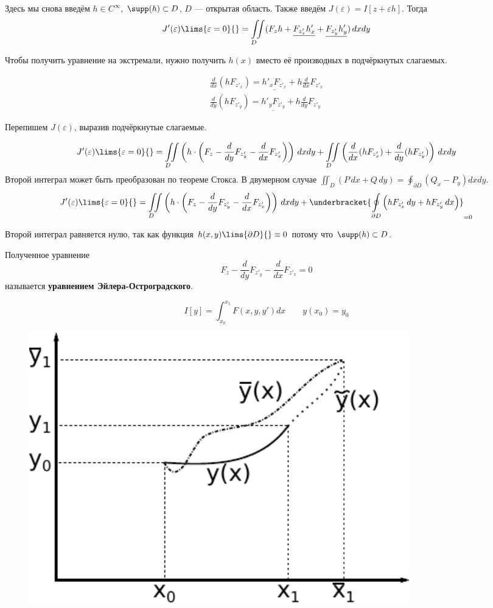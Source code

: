 	Здесь мы снова введём $h \in C^{\infty}$, $\supp(h) \subset D$, $D$ --- открытая область. Также введём
	$J(\varepsilon) = I[z + \varepsilon h]$. Тогда 
	$$J'(\varepsilon)\lims{\varepsilon = 0}{} = 
	  \underset{D\hspace{10pt}}{\iint} (F_zh + \underline{F_{z'_x}h'_x} + \underline{F_{z'_y}h'_y}) \,dxdy$$
	  
	Чтобы получить уравнение на экстремали, нужно получить $h(x)$ вместо её производных в подчёркнутых слагаемых.
	
	\begin{align*}
		\frac{d}{dx}(h F_{z'_x}) = \underline{h'_xF_{z'_x}} + h\frac{d}{dx}F_{z'_x} \\
		\frac{d}{dy}(h F_{z'_y}) = \underline{h'_yF_{z'_y}} + h\frac{d}{dy}F_{z'_y}
	\end{align*}
	
	Перепишем $J(\varepsilon)$, выразив подчёркнутые слагаемые.
	
	$$
		J'(\varepsilon)\lims{\varepsilon = 0}{} = 
		\underset{D\hspace{10pt}}{\iint} \left( h\cdot\left(F_z - \frac{d}{dy}F_{z'_y} - \frac{d}{dx}F_{z'_x}\right) \right) \,dxdy
		+ \underset{D\hspace{10pt}}{\iint} \left(\frac{d}{dx}(hF_{z'_x}) + \frac{d}{dy}(hF_{z'_y}) \right) \,dxdy
	$$
	Второй интеграл может быть преобразован по теореме Стокса. В двумерном случае 
	$\iint_{D} (P\,dx + Q\,dy) = \oint_{\partial D} (Q_x - P_y) dx dy$.
	$$
		J'(\varepsilon)\lims{\varepsilon = 0}{} = 
		\underset{D\hspace{10pt}}{\iint} \left( h\cdot\left(F_z - \frac{d}{dy}F_{z'_y} - \frac{d}{dx}F_{z'_x}\right) \right) \,dxdy
		+ \underbracket{\underset{\partial D}{\oint} \left(hF_{z'_x}\,dy + hF_{z'_y}\,dx \right)}_{=0}
	$$
	
	Второй интеграл равняется нулю, так как функция $h(x, y)\lims{\partial D}{} \equiv 0$ потому что $\supp(h) \subset D$.
	
	Полученное уравнение 
	$$F_z - \frac{d}{dy}F_{z'_y} - \frac{d}{dx}F_{z'_x} = 0$$
	называется \textbf{уравнением Эйлера-Остроградского}.
	
	$$I[y] = \int_{x_0}^{x_1} F(x, y, y')dx \qquad y(x_0) = y_0$$
	
	\begin{figure}
		\includegraphics[width=0.8\textwidth]{./../Graphics/Lectures-12-unknowntask.pdf}
	\end{figure}
	
